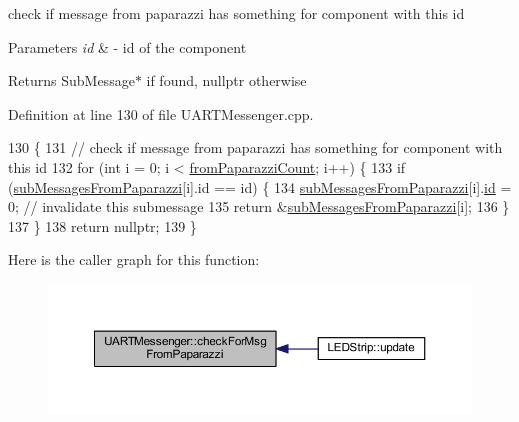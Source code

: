 check if message from paparazzi has something for component with this id 


\begin{DoxyParams}{Parameters}
{\em id} & -\/ id of the component \\
\hline
\end{DoxyParams}
\begin{DoxyReturn}{Returns}
Sub\+Message$\ast$ if found, nullptr otherwise 
\end{DoxyReturn}


Definition at line 130 of file U\+A\+R\+T\+Messenger.\+cpp.


\begin{DoxyCode}
130                                                           \{
131     \textcolor{comment}{// check if message from paparazzi has something for component with this id}
132     \textcolor{keywordflow}{for} (\textcolor{keywordtype}{int} i = 0; i < \hyperlink{class_u_a_r_t_messenger_a72ecf1c51d6a28c582fff9fd454145dd}{fromPaparazziCount}; i++) \{
133         \textcolor{keywordflow}{if} (\hyperlink{class_u_a_r_t_messenger_ad6fb0fea8b0262d46cc97f5d5b262a51}{subMessagesFromPaparazzi}[i].\textcolor{keywordtype}{id} == \textcolor{keywordtype}{id}) \{
134             \hyperlink{class_u_a_r_t_messenger_ad6fb0fea8b0262d46cc97f5d5b262a51}{subMessagesFromPaparazzi}[i].\hyperlink{struct_sub_message_af3acc450c0686d7a9d15ccd9d548cb6d}{id} = 0; \textcolor{comment}{// invalidate this submessage}
135             \textcolor{keywordflow}{return} &\hyperlink{class_u_a_r_t_messenger_ad6fb0fea8b0262d46cc97f5d5b262a51}{subMessagesFromPaparazzi}[i];
136         \}
137     \}
138     \textcolor{keywordflow}{return} \textcolor{keyword}{nullptr};
139 \}
\end{DoxyCode}
Here is the caller graph for this function\+:\nopagebreak
\begin{figure}[H]
\begin{center}
\leavevmode
\includegraphics[width=350pt]{class_u_a_r_t_messenger_affb33ad31e70001505e14d02e1f8a018_icgraph}
\end{center}
\end{figure}
\mbox{\label{class_abstract_component_ac0b440d1d642ff1292ec3c544d75a8f1}} 

